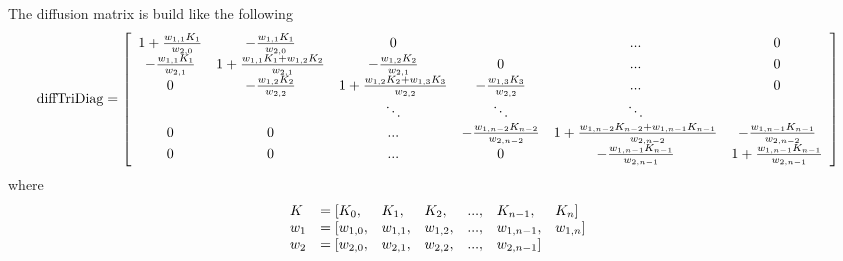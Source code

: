\documentclass[a4paper,10pt,english]{sphinxmanual}
\begin{document}
\begin{fulllineitems}
The diffusion matrix is build like the following
\begin{gather}
\begin{split}\textrm{diffTriDiag}= 
\left[ \begin{array}{cccccc}
1+\frac{w_{1,1} K_1 }{w_{2,0}} & -\frac{w_{1,1} K_1}{w_{2,0}} & 0 &  & ... & 0  \\
-\frac{w_{1,1} K_1}{w_{2,1}} & 1+\frac{w_{1,1} K_1 + w_{1,2} K_2}{w_{2,1}} & -\frac{w_{1,2} K_2}{w_{2,1}} & 0 & ... & 0 \\
0 & -\frac{w_{1,2} K_2}{w_{2,2}}  & 1+\frac{w_{1,2} K_2 + w_{1,3} K_3}{w_{2,2}} & -\frac{w_{1,3} K_3}{w_{2,2}} &... & 0  \\
  &  & \ddots & \ddots & \ddots & \\
0 & 0 & ... & -\frac{w_{1,n-2} K_{n-2}}{w_{2,n-2}}  & 1+\frac{w_{1,n-2} K_{n-2} + w_{1,n-1} K_{n-1}}{w_{2,{n-2}}} & -\frac{w_{1,n-1} K_{n-1}}{w_{2,{n-2}}} \\
0 & 0 & ... & 0 & -\frac{w_{1,n-1} K_{n-1}}{w_{2,n-1}}  & 1+\frac{w_{1,n-1} K_{n-1}}{w_{2,n-1}} \\
\end{array} \right] \end{split}\notag
\end{gather}
where
\begin{gather}
\begin{split}\begin{array}{lllllll}
     K   &= [K_0,     &K_1,    &K_2,    &...,&K_{n-1},  &K_{n}] \\
     w_1 &= [w_{1,0}, &w_{1,1},&w_{1,2},&...,&w_{1,n-1},&w_{1,n}] \\
     w_2 &= [w_{2,0}, &w_{2,1},&w_{2,2},&...,&w_{2,n-1}]
\end{array}    \end{split}\notag
\end{gather}
\end{fulllineitems}

\end{document}
